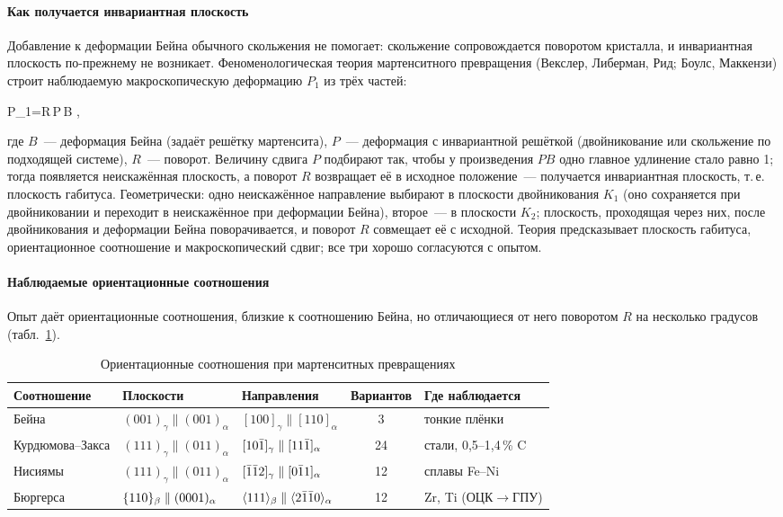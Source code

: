 \paragraph{Как получается инвариантная плоскость}
Добавление к деформации Бейна обычного скольжения не помогает: скольжение
сопровождается поворотом кристалла, и инвариантная плоскость по-прежнему
не возникает. Феноменологическая теория мартенситного превращения
(Векслер, Либерман, Рид; Боулс, Маккензи) строит наблюдаемую
макроскопическую деформацию $P_1$ из трёх частей:
\begin{keyeq}\label{eq:wlr}
P_1=R\,P\,B ,
\end{keyeq}
где $B$~— деформация Бейна (задаёт решётку мартенсита), $P$~—
деформация с инвариантной решёткой (двойникование или скольжение по
подходящей системе), $R$~— поворот. Величину сдвига $P$ подбирают так,
чтобы у произведения $PB$ одно главное удлинение стало равно 1; тогда
появляется неискажённая плоскость, а поворот $R$ возвращает её в исходное
положение~— получается инвариантная плоскость, т.\,е. плоскость
габитуса. Геометрически: одно неискажённое направление выбирают в
плоскости двойникования $K_1$ (оно сохраняется при двойниковании и
переходит в неискажённое при деформации Бейна), второе~— в плоскости
$K_2$; плоскость, проходящая через них, после двойникования и деформации
Бейна поворачивается, и поворот $R$ совмещает её с исходной. Теория
предсказывает плоскость габитуса, ориентационное соотношение и
макроскопический сдвиг; все три хорошо согласуются с опытом.

\paragraph{Наблюдаемые ориентационные соотношения}
Опыт даёт ориентационные соотношения, близкие к соотношению Бейна, но
отличающиеся от него поворотом $R$ на несколько градусов
(табл.~\ref{tab:or}).

\begin{table}[ht]
\centering
\caption{Ориентационные соотношения при мартенситных превращениях}
\label{tab:or}
\small
\begin{tabular}{@{}lllcl@{}}
\toprule
Соотношение & Плоскости & Направления & Вариантов & Где наблюдается\\
\midrule
Бейна & $(001)_\gamma\parallel(001)_\alpha$ & $[100]_\gamma\parallel[110]_\alpha$ & 3 & тонкие плёнки\\
Курдюмова--Закса & $(111)_\gamma\parallel(011)_\alpha$ & $[10\bar{1}]_\gamma\parallel[11\bar{1}]_\alpha$ & 24 & стали, 0,5--1,4\,\% C\\
Нисиямы & $(111)_\gamma\parallel(011)_\alpha$ & $[\bar{1}\bar{1}2]_\gamma\parallel[0\bar{1}1]_\alpha$ & 12 & сплавы Fe--Ni\\
Бюргерса & $\{110\}_\beta\parallel(0001)_\alpha$ & $\langle 111\rangle_\beta\parallel\langle 2\bar{1}\bar{1}0\rangle_\alpha$ & 12 & Zr, Ti (ОЦК$\to$ГПУ)\\
\bottomrule
\end{tabular}
\end{table}

